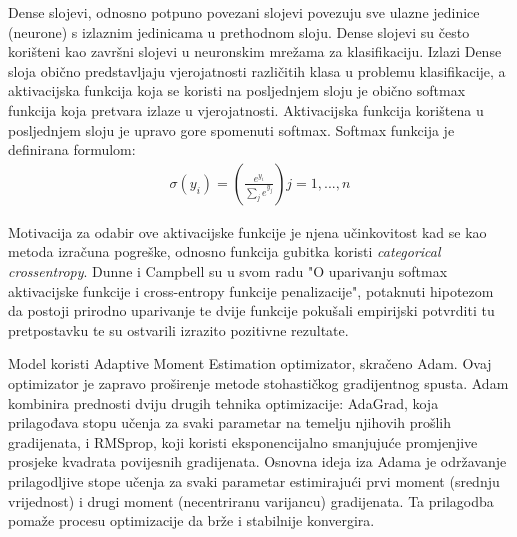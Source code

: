 \documentclass[times, utf8, zavrsni]{fer}
\begin{document}
Dense slojevi, odnosno potpuno povezani slojevi povezuju sve ulazne jedinice (neurone) s izlaznim jedinicama u prethodnom sloju.
Dense slojevi su često korišteni kao završni slojevi u neuronskim mrežama za klasifikaciju. Izlazi Dense sloja obično predstavljaju vjerojatnosti različitih klasa u problemu klasifikacije, a aktivacijska funkcija koja se koristi na posljednjem sloju je obično softmax funkcija koja pretvara izlaze u vjerojatnosti.
\pagebreak
Aktivacijska funkcija korištena u posljednjem sloju je upravo gore spomenuti softmax.
Softmax funkcija je definirana formulom: 
\begin{eqnarray}
\sigma(y_{i}) = \left(\frac{e^{y_{i}}}{ \sum\limits_{j} e^{y_{j}}}\right)
j = 1,...,n
\end{eqnarray}

Motivacija za odabir ove aktivacijske funkcije je njena učinkovitost kad se kao metoda izračuna pogreške, odnosno funkcija gubitka koristi \emph{categorical crossentropy}. \citep{dunne1997pairing}
Dunne i Campbell su u svom radu "O uparivanju softmax aktivacijske funkcije i cross-entropy funkcije penalizacije", potaknuti hipotezom da postoji prirodno uparivanje te dvije funkcije pokušali empirijski potvrditi tu pretpostavku te su ostvarili izrazito pozitivne rezultate. 

Model koristi Adaptive Moment Estimation optimizator, skračeno Adam. Ovaj optimizator je zapravo proširenje metode stohastičkog gradijentnog spusta.
Adam kombinira prednosti dviju drugih tehnika optimizacije: AdaGrad, koja prilagođava stopu učenja za svaki parametar na temelju njihovih prošlih gradijenata, i RMSprop, koji koristi eksponencijalno smanjujuće promjenjive prosjeke kvadrata povijesnih gradijenata.
Osnovna ideja iza Adama je održavanje prilagodljive stope učenja za svaki parametar estimirajući prvi moment (srednju vrijednost) i drugi moment (necentriranu varijancu) gradijenata. Ta prilagodba pomaže procesu optimizacije da brže i stabilnije konvergira.\citep{kingma2014adam}
\end{document}
